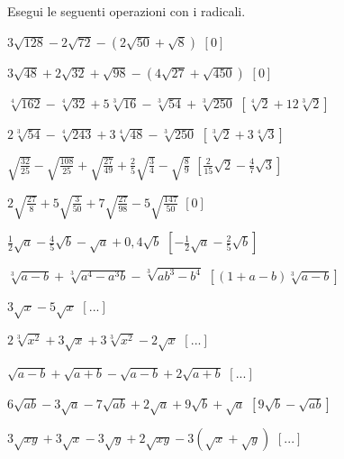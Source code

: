 \begin{esercizio}[\Ast]
 \label{ese:2.52}
Esegui le seguenti operazioni con i radicali.
 \begin{enumeratea}
 \item $3\sqrt{128}-2\sqrt{72}-(2\sqrt{50}+\sqrt 8)$
  \hfill $\left[0\right]$
 \item $3\sqrt{48}+2\sqrt{32}+\sqrt{98}-(4\sqrt{27}+\sqrt{450})$
  \hfill $\left[0\right]$
 \item $\sqrt[4]{162}-\sqrt[4]{32}+5\sqrt[3]{16}-\sqrt[3]{54}+\sqrt[3]{250}$
  \hfill $\left[\sqrt[4]2+12\sqrt[3]2\right]$
 \item $2\sqrt[3]{54}-\sqrt[4]{243}+3\sqrt[4]{48}-\sqrt[3]{250}$
  \hfill $\left[\sqrt[3]2+3\sqrt[4]3\right]$
 \item $\sqrt{\frac{32}{25}}-\sqrt{\frac{108}{25}}+\sqrt{\frac{27}{49}}+
        \frac 2 5\sqrt{\frac 3 4}-\sqrt{\frac 8 9}$
  \hfill $\left[\frac 2{15}\sqrt 2-\frac 4 7\sqrt 3\right]$
 \item $2\sqrt{\frac{27} 8}+5\sqrt{\frac 3{50}}+7\sqrt{\frac{27}{98}}-
        5\sqrt{\frac{147}{50}}$
  \hfill $\left[0\right]$
 \item $\frac 1 2\sqrt a-\frac 4 5\sqrt b-\sqrt a+0,4\sqrt b$
  \hfill $\left[-\frac 1 2\sqrt a-\frac 2 5\sqrt b\right]$
 \item $\sqrt[3]{a-b}+\sqrt[3]{a^4-a^3b}-\sqrt[3]{{ab}^3-b^4}$
  \hfill $\left[(1+a-b)\sqrt[3]{a-b}\right]$
 \item $3\sqrt x-5\sqrt x$
  \hfill $\left[...\right]$
 \item $2\sqrt[3]{x^2}+3\sqrt x+3\sqrt[3]{x^2}-2\sqrt x$
  \hfill $\left[...\right]$
 \item $\sqrt{a-b}+\sqrt{a+b}-\sqrt{a-b}+2\sqrt{a+b}$
  \hfill $\left[...\right]$
 \item $6\sqrt{{ab}}-3\sqrt a-7\sqrt{{ab}}+2\sqrt a+9\sqrt b+\sqrt a$
  \hfill $\left[9\sqrt b-\sqrt{ab}\right]$
 \item $3\sqrt{xy}+3\sqrt x-3\sqrt y+2\sqrt{xy}-3(\sqrt x+\sqrt y)$
  \hfill $\left[...\right]$
 \end{enumeratea}
\end{esercizio}

